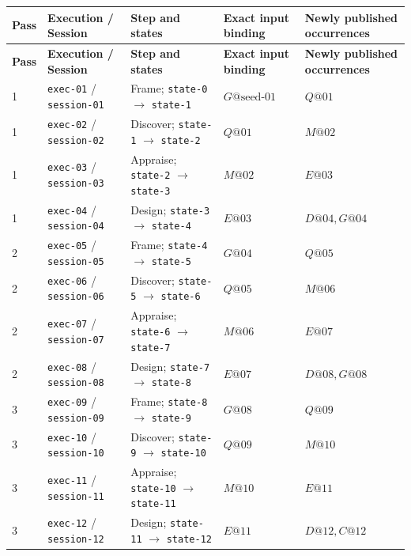 \documentclass[11pt]{article}
\begin{document}
{\scriptsize
\begin{longtable}{@{}L{0.30in}L{0.82in}L{1.42in}L{0.84in}L{2.32in}@{}}
\toprule
\textbf{Pass} & \textbf{Execution / Session} & \textbf{Step and states} & \textbf{Exact input binding} & \textbf{Newly published occurrences} \\
\midrule
\endfirsthead
\toprule
\textbf{Pass} & \textbf{Execution / Session} & \textbf{Step and states} & \textbf{Exact input binding} & \textbf{Newly published occurrences} \\
\midrule
{} & \texttt{exec-01} / \texttt{session-01} & Frame; \texttt{state-0} \(\to\) \texttt{state-1} & \(G@\mathrm{seed\mbox{-}01}\) & \(Q@01\) \\
1 & \texttt{exec-02} / \texttt{session-02} & Discover; \texttt{state-1} \(\to\) \texttt{state-2} & \(Q@01\) & \(M@02\) \\
1 & \texttt{exec-03} / \texttt{session-03} & Appraise; \texttt{state-2} \(\to\) \texttt{state-3} & \(M@02\) & \(E@03\) \\
1 & \texttt{exec-04} / \texttt{session-04} & Design; \texttt{state-3} \(\to\) \texttt{state-4} & \(E@03\) & \(D@04, G@04\) \\
2 & \texttt{exec-05} / \texttt{session-05} & Frame; \texttt{state-4} \(\to\) \texttt{state-5} & \(G@04\) & \(Q@05\) \\
2 & \texttt{exec-06} / \texttt{session-06} & Discover; \texttt{state-5} \(\to\) \texttt{state-6} & \(Q@05\) & \(M@06\) \\
2 & \texttt{exec-07} / \texttt{session-07} & Appraise; \texttt{state-6} \(\to\) \texttt{state-7} & \(M@06\) & \(E@07\) \\
2 & \texttt{exec-08} / \texttt{session-08} & Design; \texttt{state-7} \(\to\) \texttt{state-8} & \(E@07\) & \(D@08, G@08\) \\
3 & \texttt{exec-09} / \texttt{session-09} & Frame; \texttt{state-8} \(\to\) \texttt{state-9} & \(G@08\) & \(Q@09\) \\
3 & \texttt{exec-10} / \texttt{session-10} & Discover; \texttt{state-9} \(\to\) \texttt{state-10} & \(Q@09\) & \(M@10\) \\
3 & \texttt{exec-11} / \texttt{session-11} & Appraise; \texttt{state-10} \(\to\) \texttt{state-11} & \(M@10\) & \(E@11\) \\
3 & \texttt{exec-12} / \texttt{session-12} & Design; \texttt{state-11} \(\to\) \texttt{state-12} & \(E@11\) & \(D@12, C@12\) \\
\bottomrule
\end{longtable}
}
\end{document}

